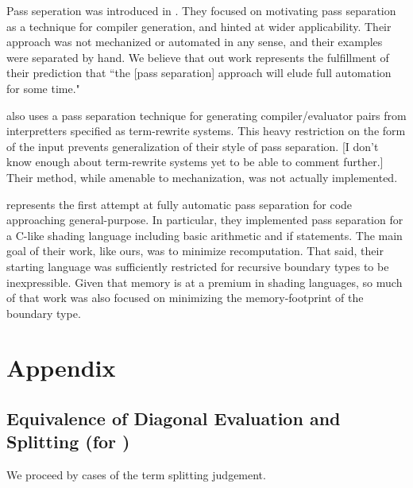 \documentclass{article}
\begin{document}
Pass seperation was introduced in \cite{jorring}.  They focused on motivating pass separation as a technique for compiler generation, and hinted at wider applicability.  Their approach was not mechanized or automated in any sense, and their examples were separated by hand.  We believe that out work represents the fulfillment of their prediction that ``the [pass separation] approach will elude full automation for some time."

\cite{hannan94} also uses a pass separation technique for generating compiler/evaluator pairs from interpretters specified as term-rewrite systems.  This heavy restriction on the form of the input prevents generalization of their style of pass separation.  [I don't know enough about term-rewrite systems yet to be able to comment further.]  Their method, while amenable to mechanization, was not actually implemented.

\cite{knoblock} represents the first attempt at fully automatic pass separation for code approaching general-purpose.  In particular, they implemented pass separation for a C-like shading language including basic arithmetic and if statements.  The main goal of their work, like ours, was to minimize recomputation. That said, their starting language was sufficiently restricted for recursive boundary types to be inexpressible.  Given that memory is at a premium in shading languages, so much of that work was also focused on minimizing the memory-footprint of the boundary type.

\section{Appendix}

\subsection {Equivalence of Diagonal Evaluation and Splitting (for \ellStaged)}

We proceed by cases of the term splitting judgement.
\end{document}
